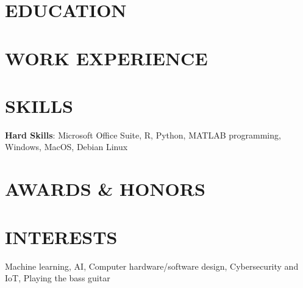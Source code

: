 \documentclass[11pt,letterpaper]{article}
\newcommand{\xspace}{0.7\baselineskip}
\begin{document}


\section*{EDUCATION} %
    

\section*{WORK EXPERIENCE}
    
    \vspace{\xspace}
    
    \vspace{\xspace}
    


\section*{SKILLS}
    \textbf{Hard Skills}: Microsoft Office Suite, R, Python, MATLAB programming, Windows, MacOS, Debian Linux \\ 
    


\section{AWARDS \& HONORS}
    

\section*{INTERESTS}
    Machine learning, AI, Computer hardware/software design, Cybersecurity and IoT, Playing the bass guitar
\end{document}
